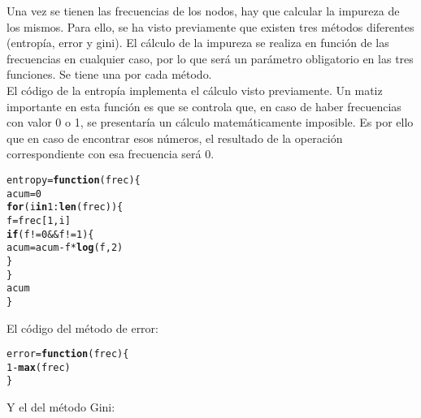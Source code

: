 \documentclass[12pt]{report}\usepackage[]{graphicx}\usepackage[dvipsnames]{xcolor}
\makeatletter
\newcommand{\hlnum}[1]{\textcolor[rgb]{0.686,0.059,0.569}{#1}}%
\newcommand{\hlopt}[1]{\textcolor[rgb]{0,0,0}{#1}}%
\newcommand{\hlstd}[1]{\textcolor[rgb]{0.345,0.345,0.345}{#1}}%
\newcommand{\hlkwa}[1]{\textcolor[rgb]{0.161,0.373,0.58}{\textbf{#1}}}%
\newcommand{\hlkwb}[1]{\textcolor[rgb]{0.69,0.353,0.396}{#1}}%
\newcommand{\hlkwc}[1]{\textcolor[rgb]{0.333,0.667,0.333}{#1}}%
\newcommand{\hlkwd}[1]{\textcolor[rgb]{0.737,0.353,0.396}{\textbf{#1}}}%
\newenvironment{kframe}{%
 \def\at@end@of@kframe{}%
 \ifinner\ifhmode%
  \def\at@end@of@kframe{\end{minipage}}%
  \begin{minipage}{\columnwidth}%
 \fi\fi%
 \def\FrameCommand##1{\hskip\@totalleftmargin \hskip-\fboxsep
 \colorbox{shadecolor}{##1}\hskip-\fboxsep
     \hskip-\linewidth \hskip-\@totalleftmargin \hskip\columnwidth}%
 \MakeFramed {\advance\hsize-\width
   \@totalleftmargin\z@ \linewidth\hsize
   \@setminipage}}%
 {\par\unskip\endMakeFramed%
 \at@end@of@kframe}
\newenvironment{knitrout}{}{} %
\makeatother
\begin{document}
 			Una vez se tienen las frecuencias de los nodos, hay que calcular la impureza de los mismos. Para ello, se ha visto previamente que existen tres métodos diferentes (entropía, error y gini). El cálculo de la impureza se realiza en función de las frecuencias en cualquier caso, por lo que será un parámetro obligatorio en las tres funciones. Se tiene una por cada método.\\
 			
 			El código de la entropía implementa el cálculo visto previamente. Un matiz importante en esta función es que se controla que, en caso de haber frecuencias con valor 0 o 1, se presentaría un cálculo matemáticamente imposible. Es por ello que en caso de encontrar esos números, el resultado de la operación correspondiente con esa frecuencia será 0.
 			
\begin{knitrout}
\color{fgcolor}\begin{kframe}
\begin{alltt}
\hlstd{entropy} \hlkwb{=} \hlkwa{function}\hlstd{(}\hlkwc{frec}\hlstd{) \{}
        \hlstd{acum} \hlkwb{=} \hlnum{0}
        \hlkwa{for} \hlstd{(i} \hlkwa{in} \hlnum{1}\hlopt{:}\hlkwd{len}\hlstd{(frec)) \{}
                \hlstd{f} \hlkwb{=} \hlstd{frec[}\hlnum{1}\hlstd{, i]}
                \hlkwa{if} \hlstd{(f} \hlopt{!=} \hlnum{0} \hlopt{&&} \hlstd{f} \hlopt{!=} \hlnum{1}\hlstd{) \{}
                        \hlstd{acum} \hlkwb{=} \hlstd{acum} \hlopt{-} \hlstd{f} \hlopt{*} \hlkwd{log}\hlstd{(f,} \hlnum{2}\hlstd{)}
                \hlstd{\}}
        \hlstd{\}}
        \hlstd{acum}
\hlstd{\}}
\end{alltt}
\end{kframe}
\end{knitrout}
 			
 			El código del método de error:
 			
\begin{knitrout}
\color{fgcolor}\begin{kframe}
\begin{alltt}
\hlstd{error} \hlkwb{=} \hlkwa{function}\hlstd{(}\hlkwc{frec}\hlstd{) \{}
        \hlnum{1} \hlopt{-} \hlkwd{max}\hlstd{(frec)}
\hlstd{\}}
\end{alltt}
\end{kframe}
\end{knitrout}
 			
 			Y el del método Gini:
 			
\end{document}

